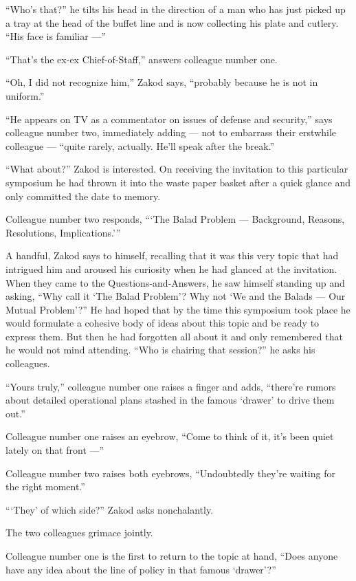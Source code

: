 \documentclass[twoside,11pt,openany]{book}
\begin{document}
``Who's that?'' he tilts his head in the direction of a man who has just picked up a tray at
the head of the buffet line and is now collecting his plate and cutlery. ``His face is familiar ---''

``That's the ex-ex Chief-of-Staff,'' answers colleague number one.

``Oh, I did not recognize him,'' Zakod says, ``probably because he is not in
uniform.''

``He appears on TV as a commentator on issues of defense and security,'' says colleague number
two, immediately adding --- not to embarrass their erstwhile colleague --- ``quite rarely, actually. He'll
speak after the break.''

``What about?'' Zakod is interested. On receiving the invitation to this particular symposium
he had thrown it into the waste paper basket after a quick glance and only committed the date to memory.

Colleague number two responds, ``{\thinspace}`The Balad Problem --- Background, Reasons, Resolutions,
Implications.'\thinspace''

A handful, Zakod says to himself, recalling that it was this very topic that had intrigued him and aroused his curiosity
when he had glanced at the invitation. When they{ }came{ }to
the Questions-and-Answers{, }he saw himself standing up and asking, ``Why call it `The
Balad Problem'? Why not `We and the Balads --- Our Mutual Problem'?'' He had hoped that by the time this
symposium{ }took place he would formulate a cohesive body of ideas about this topic and be ready to
express them. But then he had forgotten all about it and only remembered that he would not mind attending.
``Who is chairing that session?'' he asks his colleagues.

``Yours truly,'' colleague number one raises a finger and adds, ``there're rumors
about detailed operational plans stashed in the famous `drawer' to drive them out.''

Colleague number one raises an eyebrow, ``Come to think of it, it's been quiet lately on that front ---''

Colleague number two raises both eyebrows, ``Undoubtedly they're waiting for the
right moment.''

``{\thinspace}`They' of which side?'' Zakod asks nonchalantly.

The two colleagues grimace jointly.

Colleague number one is the first to return to the topic at hand, ``Does anyone have any idea about the
line of policy in that famous `drawer{}'?''
\end{document}

